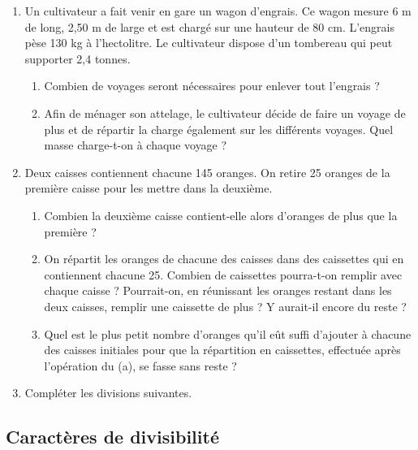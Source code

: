 \documentclass[12 pt]{extarticle}
\theoremstyle{plain}
\begin{document}
\begin{enumerate}
\begin{enumerate}
 \end{enumerate}
 \item Un cultivateur a fait venir en gare un wagon 
 d'engrais. Ce wagon mesure 6 m de long, 2,50 m de large et est chargé sur une hauteur de 80 cm. 
 L'engrais pèse 130 kg à l'hectolitre. Le cultivateur dispose d'un tombereau qui peut supporter 2,4 tonnes. 
 \begin{enumerate}
 \item Combien de voyages seront nécessaires pour enlever
 tout l'engrais ?
 \item  Afin de ménager son attelage, le cultivateur décide de faire un voyage de plus et de répartir la charge également sur les différents voyages. Quel masse charge-t-on à chaque voyage ? 
 \end{enumerate}
 \item Deux caisses contiennent chacune 145 oranges. On retire 25 oranges de la première caisse pour les mettre dans la deuxième. 
 \begin{enumerate}
 \item Combien la deuxième caisse contient-elle alors d'oranges de plus que la première ? 
 \item On répartit les oranges de chacune des caisses 
 dans des caissettes qui en contiennent chacune 25. 
 Combien de caissettes pourra-t-on remplir avec chaque
 caisse ? Pourrait-on, en réunissant les oranges restant dans les deux caisses, remplir une caissette
 de plus ? Y aurait-il encore du reste ? 
 \item Quel est le plus petit nombre d'oranges qu'il eût suffi d'ajouter à chacune des caisses initiales pour que la répartition en caissettes, effectuée après l'opération du (a), se fasse sans reste ? 
 \end{enumerate}
 \item Compléter les divisions suivantes. 
 
 \end{enumerate}
 
 \subsection{Caractères de divisibilité}
 	
\end{document}
